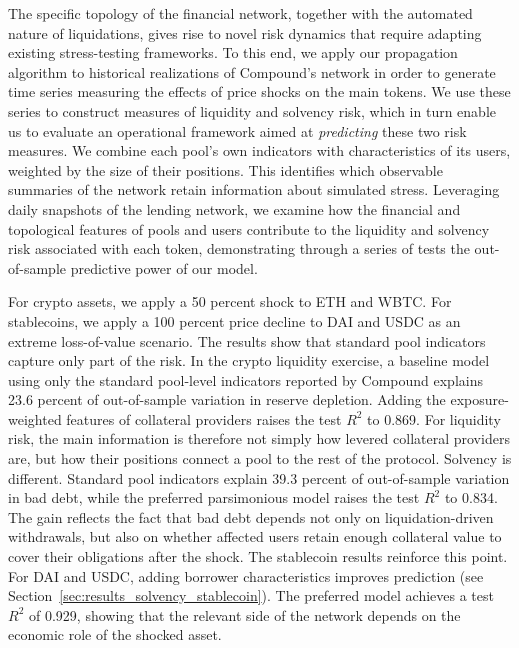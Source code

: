 \documentclass[a4paper,UKenglish,cleveref, autoref, thm-restate]{informs3}
\DeclareRobustCommand{\latestrev}[1]{{\color{red}\hypersetup{linkcolor=red,citecolor=red,urlcolor=red}#1}}
\begin{document}
The specific topology of the financial network, together with the automated nature of liquidations, gives rise to novel risk dynamics that require adapting existing stress-testing frameworks. To this end, we apply our propagation algorithm to historical realizations of Compound’s network in order to generate time series measuring the effects of price shocks on the main tokens. We use these series to construct measures of liquidity and solvency risk, which in turn enable us to evaluate an operational framework aimed at \textit{predicting} these two risk measures. \latestrev{We combine each pool's own indicators with characteristics of its users, weighted by the size of their positions. This identifies which observable summaries of the network retain information about simulated stress.} Leveraging daily snapshots of the lending network, we examine how the financial and topological features of pools and users contribute to the liquidity and solvency risk associated with each token, demonstrating through a series of tests the out-of-sample predictive power of our model.

For crypto assets, we apply a 50 percent shock to ETH and WBTC. For stablecoins, we apply \latestrev{a 100 percent price decline to DAI and USDC as an extreme loss-of-value scenario}. The results show that standard pool indicators capture only part of the risk. In the crypto liquidity exercise, a baseline model using only the standard pool-level indicators reported by Compound explains 23.6 percent of out-of-sample variation in reserve depletion. Adding the exposure-weighted features of \latestrev{collateral providers raises} the test \(R^2\) to 0.869. For liquidity risk, the main information is therefore not simply how levered collateral providers are, but how their positions connect a pool to the rest of the protocol. Solvency is different. Standard pool indicators explain 39.3 percent of out-of-sample variation in bad debt, while the preferred parsimonious model raises the test \(R^2\) to 0.834. The gain reflects the fact that bad debt depends not only on liquidation-driven withdrawals, but also on whether affected users retain enough collateral value to cover their obligations after the shock. The stablecoin results reinforce this point. \latestrev{For DAI and USDC, adding borrower characteristics improves prediction (see Section~\ref{sec:results_solvency_stablecoin}).} The preferred model achieves a test \(R^2\) of 0.929, showing that the relevant side of the network depends on the economic role of the shocked asset.
\end{document}
